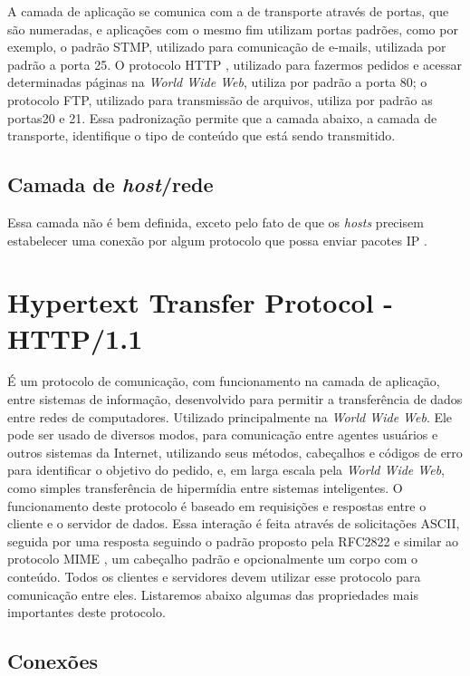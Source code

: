 A camada de aplicação se comunica com a de transporte através de portas, que são numeradas, e aplicações com o mesmo fim utilizam portas padrões, como por exemplo, o padrão STMP, utilizado para comunicação de e-mails, utilizada por padrão a porta 25. O protocolo HTTP \cite{rfc2616_http1.1}, utilizado para fazermos pedidos e acessar determinadas páginas na \textit{World Wide Web}, utiliza por padrão a porta 80; o protocolo FTP, utilizado para transmissão de arquivos, utiliza por padrão as portas20 e 21. Essa padronização permite que a camada abaixo, a camada de transporte, identifique o tipo de conteúdo que está sendo transmitido.


\subsection{Camada de \textit{host}/rede}
Essa camada não é bem definida, exceto pelo fato de que os \textit{hosts} precisem estabelecer uma conexão por algum protocolo que possa enviar pacotes IP \cite{tanenbaumredes}.


\section{Hypertext Transfer Protocol - HTTP/1.1}
É um protocolo de comunicação, com funcionamento na camada de aplicação, entre sistemas de informação, desenvolvido para permitir a transferência de dados entre redes de computadores. Utilizado principalmente na \textit{World Wide Web}.
Ele pode ser usado de diversos modos, para comunicação entre agentes usuários e outros sistemas da Internet, utilizando seus métodos, cabeçalhos e códigos de erro para identificar o objetivo do pedido, e, em larga escala pela \textit{World Wide Web}, como simples transferência de hipermídia entre sistemas inteligentes.
O funcionamento deste protocolo é baseado em requisições e respostas entre o cliente e o servidor de dados. Essa interação é feita através de solicitações ASCII, seguida por uma resposta seguindo o padrão proposto pela RFC2822 \cite{rfc2822_resnick_int_message_format} e similar ao protocolo MIME \cite{rfc2045_freed_borestein_mime}, um cabeçalho padrão e opcionalmente um corpo com o conteúdo. Todos os clientes e servidores devem utilizar esse protocolo para comunicação entre eles. Listaremos abaixo algumas das propriedades mais importantes deste protocolo.


\subsection{Conexões}

